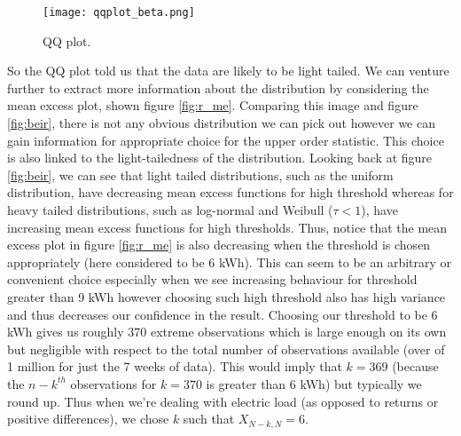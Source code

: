 \documentclass[a4paper]{article}
\begin{document}
\begin{figure}
\centering
\texttt{[image: qqplot\_beta.png]}
\caption{\label{fig:beta} QQ plot.}
\end{figure}

So the QQ plot told us that the data are likely to be light tailed. We can venture further to extract more information about the distribution by considering the mean excess plot, shown figure \ref{fig:r_me}. Comparing this image and figure \ref{fig:beir}, there is not any obvious distribution we can pick out however we can gain information for appropriate choice for the upper order statistic. This choice is also linked to the light-tailedness of the distribution. Looking back at figure \ref{fig:beir}, we can see that light tailed distributions, such as the uniform distribution, have decreasing mean excess functions for high threshold whereas for heavy tailed distributions, such as log-normal and Weibull ($\tau<1$), have increasing mean excess functions for high thresholds. Thus, notice that the mean excess plot in figure \ref{fig:r_me} is also decreasing when the threshold is chosen appropriately (here considered to be 6 kWh). This can seem to be an arbitrary or convenient choice especially when we see increasing behaviour for threshold greater than 9 kWh however choosing such high threshold also has high variance and thus decreases our confidence in the result. Choosing our threshold to be 6 kWh gives us roughly 370 extreme observations which is large enough on its own but negligible with respect to the total number of observations available (over of 1 million for just the 7 weeks of data). This would imply that $k=369$ (because the $n-k^{th}$ observations for $k=370$ is greater than 6 kWh) but typically we round up. Thus when we're dealing with electric load (as opposed to returns or positive differences), we chose $k$ such that $X_{N-k,N} = 6$.


\end{document}
